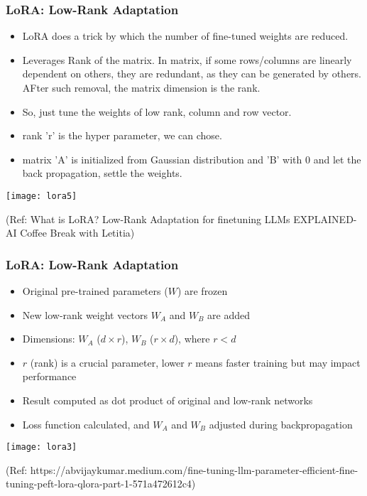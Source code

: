 \begin{frame}[fragile]\frametitle{LoRA: Low-Rank Adaptation}
    \begin{itemize}
        \item LoRA does a trick by which the number of fine-tuned weights are reduced.
		\item Leverages Rank of the matrix. In matrix, if some rows/columns are linearly dependent on others, they are redundant, as they can be generated by others. AFter such removal, the matrix dimension is the rank.
		\item So, just tune the weights of low rank, column and row vector.
		\item rank 'r' is the hyper parameter, we can chose.
		\item matrix 'A' is initialized from Gaussian distribution and 'B' with $0$ and let the back propagation, settle the weights.
    \end{itemize}

		\begin{center}
		\texttt{[image: lora5]}
		
		{\tiny (Ref: What is LoRA? Low-Rank Adaptation for finetuning LLMs EXPLAINED-AI Coffee Break with Letitia)}
		\end{center}

\end{frame}



\begin{frame}[fragile]\frametitle{LoRA: Low-Rank Adaptation}
    \begin{itemize}
        \item Original pre-trained parameters ($W$) are frozen
        \item New low-rank weight vectors $W_A$ and $W_B$ are added
        \item Dimensions: $W_A$ ($d \times r$), $W_B$ ($r \times d$), where $r < d$
        \item $r$ (rank) is a crucial parameter, lower $r$ means faster training but may impact performance
        \item Result computed as dot product of original and low-rank networks
        \item Loss function calculated, and $W_A$ and $W_B$ adjusted during backpropagation
    \end{itemize}

		\begin{center}
		\texttt{[image: lora3]}
		
		{\tiny (Ref: https://abvijaykumar.medium.com/fine-tuning-llm-parameter-efficient-fine-tuning-peft-lora-qlora-part-1-571a472612c4)}
		\end{center}

\end{frame}


